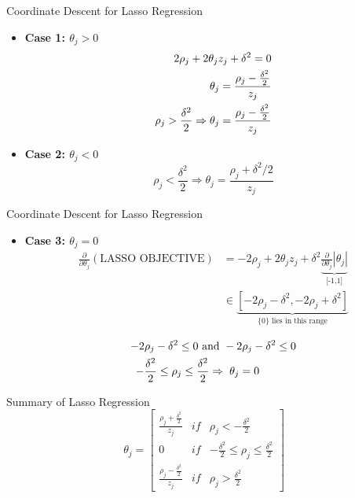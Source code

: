 \documentclass{beamer}
\begin{document}
\begin{frame}{Coordinate Descent for Lasso Regression}
\begin{itemize}[<+->]
\item \textbf{Case 1: $\theta_{j}>0$}
\begin{align*}
\-2\rho_j+2\theta_j z_j+\delta^{2}  = 0\\
\theta_j = \frac{\rho_j - \frac{\delta^{2}}{2}}{z_{j}}\\
\rho_{j}>\frac{\delta^{2}}{2} \Rightarrow  \theta_{j} = \frac{\rho_j - \frac{\delta^{2}}{2}}{z_{j}}
\end{align*}

\item \textbf{Case 2: $\theta_{j}<0$}
\begin{equation}
\rho_{j} < \frac{\delta^{2}}{2} \Rightarrow \theta_{j} = \frac{\rho_{j}+\delta^{2} / 2}{z_{j}}
\end{equation}
\end{itemize}

\end{frame}

\begin{frame}{Coordinate Descent for Lasso Regression}
\begin{itemize}
\item \textbf{Case 3: $\theta_{j} = 0$}
\begin{align*}
\frac{\partial}{\partial \theta_{j}}(\text {LASSO OBJECTIVE})&=-2 \rho_{j}+2\theta_{j} z_{j}+ \delta^{2}\underbrace{{\frac{\partial}{\partial \theta_{j}}}\left|\theta_{j}\right|}_{\text{[-1,1]}}\\
&\in \underbrace{[-2\rho_{j} - \delta^{2}, -2\rho_{j} + \delta^{2}]}_{\text{$\{0\}$ lies in this range}}\\
\end{align*}
\begin{align*}
-2\rho_{j} - \delta^{2} \leq 0 \text{ and }& -2\rho_{j} - \delta^{2} \leq 0\\
-\frac{\delta^{2}}{2} \leq \rho_j \leq \frac{\delta^{2}}{2}  \Rightarrow & \hspace{2mm} \theta_{j}=0
\end{align*}

\end{itemize}

\end{frame}
\begin{frame}{Summary of Lasso Regression}
\begin{equation}
\theta_{j} =\left[\begin{array}{ccc}
{\frac{\rho_{j} + \frac{\delta^{2}}{2}}{z_{j}}} & {if}  & {\rho_{j}<-\frac{\delta^{2}}{2}} \\
{0} & {if} & {-\frac{\delta^{2}}{2} \leq \rho_{j} \leq \frac{\delta^{2}}{2}} \\
{\frac{\rho_{j} - \frac{\delta^{2}}{2}}{z_{j}}} & {i f} & {\rho_{j}>\frac{\delta^{2}}{2}}
\end{array}\right]
\end{equation}

\end{frame}

%
\end{document}
